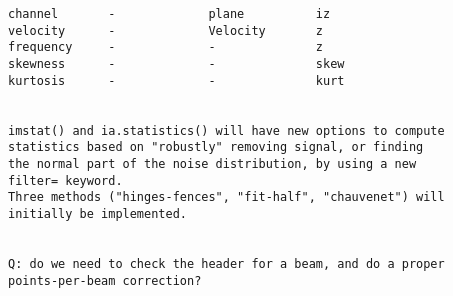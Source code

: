 \begin{description}
\begin{verbatim}
channel       -             plane          iz
velocity      -             Velocity       z
frequency     -             -              z
skewness      -             -              skew
kurtosis      -             -              kurt


imstat() and ia.statistics() will have new options to compute
statistics based on "robustly" removing signal, or finding
the normal part of the noise distribution, by using a new 
filter= keyword.
Three methods ("hinges-fences", "fit-half", "chauvenet") will
initially be implemented.


Q: do we need to check the header for a beam, and do a proper
points-per-beam correction?
\end{verbatim}
\end{description}
